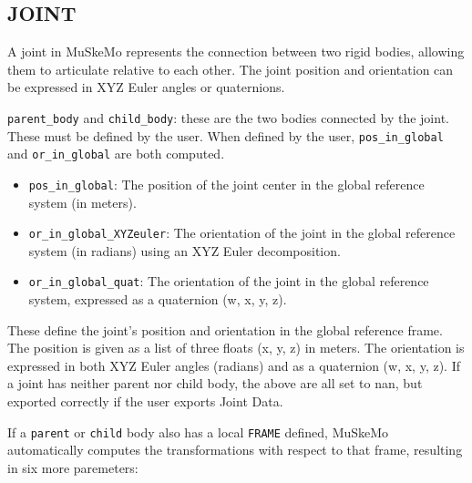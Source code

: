 \documentclass{article}
\begin{document}
\subsection{JOINT}
\label{sec:joint}

A joint in MuSkeMo represents the connection between two rigid bodies, allowing them to articulate relative to each other. The joint position and orientation can be expressed in XYZ Euler angles or quaternions.

\texttt{parent\_body} and \texttt{child\_body}: these are the two bodies connected by the joint. These must be defined by the user. When defined by the user, \texttt{pos\_in\_global} and \texttt{or\_in\_global} are both computed.

\begin{itemize}
    \item \texttt{pos\_in\_global}: The position of the joint center in the global reference system (in meters).
    \item \texttt{or\_in\_global\_XYZeuler}: The orientation of the joint in the global reference system (in radians) using an XYZ Euler decomposition.
    \item \texttt{or\_in\_global\_quat}: The orientation of the joint in the global reference system, expressed as a quaternion (w, x, y, z).
\end{itemize}

These define the joint's position and orientation in the global reference frame. The position is given as a list of three floats (x, y, z) in meters. The orientation is expressed in both XYZ Euler angles (radians) and as a quaternion (w, x, y, z). If a joint has neither parent nor child body, the above are all set to nan, but exported correctly if the user exports Joint Data.

If a \texttt{parent} or \texttt{child} body also has a local \texttt{FRAME} defined, MuSkeMo automatically computes the transformations with respect to that frame, resulting in six more paremeters:
\end{document}
